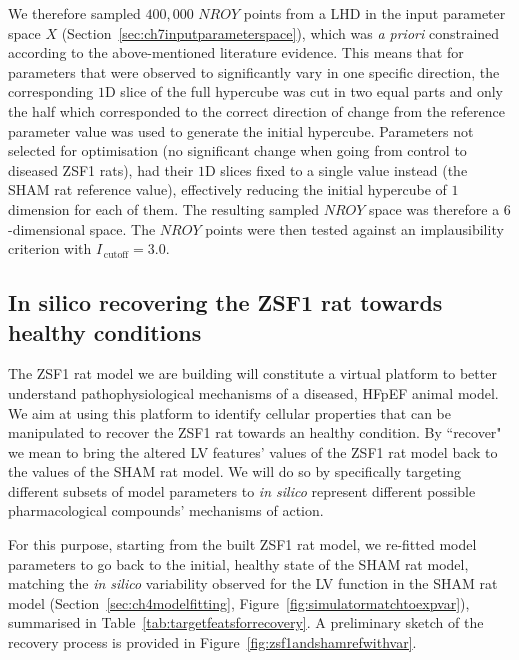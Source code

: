 \vspace{0.2cm}
We therefore sampled $400,000$ $NROY$ points from a LHD in the input parameter space $X$ (Section~\ref{sec:ch7inputparameterspace}), which was \textit{a priori} constrained according to the above-mentioned literature evidence. This means that for parameters that were observed to significantly vary in one specific direction, the corresponding $1$D slice of the full hypercube was cut in two equal parts and only the half which corresponded to the correct direction of change from the reference parameter value was used to generate the initial hypercube. Parameters not selected for optimisation (no significant change when going from control to diseased ZSF1 rats), had their $1$D slices fixed to a single value instead (the SHAM rat reference value), effectively reducing the initial hypercube of $1$ dimension for each of them. The resulting sampled $NROY$ space was therefore a $6$-dimensional space. The $NROY$ points were then tested against an implausibility criterion with $I_{\,\textrm{cutoff}}=3.0$.


%
%
%
\subsection{In silico recovering the ZSF1 rat towards healthy conditions}\label{sec:ch7in_silico_recovering_the_zsf1_rat_towards_healthy_conditions}
The ZSF1 rat model we are building will constitute a virtual platform to better understand pathophysiological mechanisms of a diseased, HFpEF animal model. We aim at using this platform to identify cellular properties that can be manipulated to recover the ZSF1 rat towards an healthy condition. By ``recover" we mean to bring the altered LV features' values of the ZSF1 rat model back to the values of the SHAM rat model. We will do so by specifically targeting different subsets of model parameters to \textit{in silico} represent different possible pharmacological compounds' mechanisms of action.

\vspace{0.2cm}
For this purpose, starting from the built ZSF1 rat model, we re-fitted model parameters to go back to the initial, healthy state of the SHAM rat model, matching the \textit{in silico} variability observed for the LV function in the SHAM rat model (Section~\ref{sec:ch4modelfitting}, Figure~\ref{fig:simulatormatchtoexpvar}), summarised in Table~\ref{tab:targetfeatsforrecovery}. A preliminary sketch of the recovery process is provided in Figure~\ref{fig:zsf1andshamrefwithvar}.

